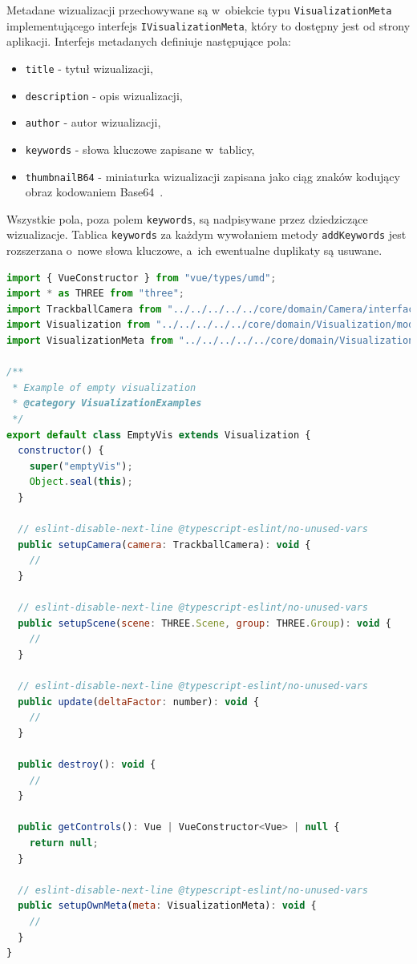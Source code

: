 \begin{samepage}
Metadane wizualizacji przechowywane są w~obiekcie typu \texttt{VisualizationMeta} implementującego interfejs \texttt{IVisualizationMeta}, który to dostępny jest od strony aplikacji. Interfejs metadanych definiuje następujące pola:

\begin{itemize}
    \item \texttt{title} - tytuł wizualizacji,
    \item \texttt{description} - opis wizualizacji,
    \item \texttt{author} - autor wizualizacji,
    \item \texttt{keywords} - słowa kluczowe zapisane w~tablicy,
    \item \texttt{thumbnailB64} - miniaturka wizualizacji zapisana jako ciąg znaków kodujący obraz kodowaniem Base64~\cite{Base64}.
\end{itemize}

Wszystkie pola, poza polem \texttt{keywords}, są nadpisywane przez dziedziczące wizualizacje. Tablica \texttt{keywords} za każdym wywołaniem metody \texttt{addKeywords} jest rozszerzana o~nowe słowa kluczowe, a~ich ewentualne duplikaty są usuwane.
 
\end{samepage} 

\begin{samepage}
    \begin{lstlisting}[float, language=javascript, label={lst:vis}, caption={Pusta  klasa wizualizacji \texttt{EmptyVis} rozszerzająca klasę \texttt{Visualization}}]
import { VueConstructor } from "vue/types/umd";
import * as THREE from "three";
import TrackballCamera from "../../../../../core/domain/Camera/interfaces/TrackballCamera";
import Visualization from "../../../../../core/domain/Visualization/models/Visualization";
import VisualizationMeta from "../../../../../core/domain/Visualization/models/VisualizationMeta";

/**
 * Example of empty visualization
 * @category VisualizationExamples
 */
export default class EmptyVis extends Visualization {
  constructor() {
    super("emptyVis");
    Object.seal(this);
  }

  // eslint-disable-next-line @typescript-eslint/no-unused-vars
  public setupCamera(camera: TrackballCamera): void {
    //
  }

  // eslint-disable-next-line @typescript-eslint/no-unused-vars
  public setupScene(scene: THREE.Scene, group: THREE.Group): void {
    //
  }

  // eslint-disable-next-line @typescript-eslint/no-unused-vars
  public update(deltaFactor: number): void {
    //
  }

  public destroy(): void {
    //
  }

  public getControls(): Vue | VueConstructor<Vue> | null {
    return null;
  }

  // eslint-disable-next-line @typescript-eslint/no-unused-vars
  public setupOwnMeta(meta: VisualizationMeta): void {
    //
  }
}
    \end{lstlisting}
\end{samepage}

